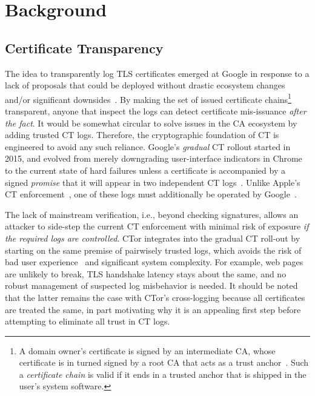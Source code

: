 \section{Background} \label{sec:background}

\subsection{Certificate Transparency} \label{sec:background:ct}
The idea to transparently log TLS certificates emerged at Google in response to
a lack of proposals that could be deployed without drastic ecosystem changes
and/or significant downsides~\cite{ct/a}.  By making the set of issued
certificate chains\footnote{
	A domain owner's certificate is signed by an intermediate CA, whose
	certificate is in turned signed by a root CA that acts as a trust
	anchor~\cite{ca-ecosystem}.  Such a \emph{certificate chain} is valid if it
	ends in a trusted anchor that is shipped in the user's system software.
} transparent, anyone that inspect the logs can detect certificate
mis-issuance \emph{after the fact}.  It would be somewhat circular to solve
issues in the CA ecosystem by adding trusted CT logs.  Therefore, the
cryptographic foundation of CT is engineered to avoid any such reliance.
Google's \emph{gradual} CT rollout started in 2015, and evolved from merely
downgrading user-interface indicators in Chrome to the current state of hard
failures unless a certificate is accompanied by a signed \emph{promise} that it
will appear in two independent CT logs~\cite{does-ct-break-the-web}.  Unlike
Apple's CT enforcement~\cite{safari-policy}, one of these logs must additionally
be operated by Google~\cite{chrome-policy}.

The lack of mainstream verification, i.e., beyond checking signatures, allows an
attacker to side-step the current CT enforcement with minimal risk of exposure
\emph{if the required logs are controlled}.  CTor integrates into the gradual
CT roll-out by starting on the same premise of pairwisely trusted logs, which
avoids the risk of bad user experience~\cite{does-ct-break-the-web}
and significant system complexity.  For example, web pages are unlikely to
break, TLS handshake latency stays about the same, and no robust management of
suspected log misbehavior is needed.  It should be noted that the latter remains
the case with CTor's cross-logging because all certificates are treated the
same, in part motivating why it is an appealing first step before attempting to
eliminate all trust in CT logs.

